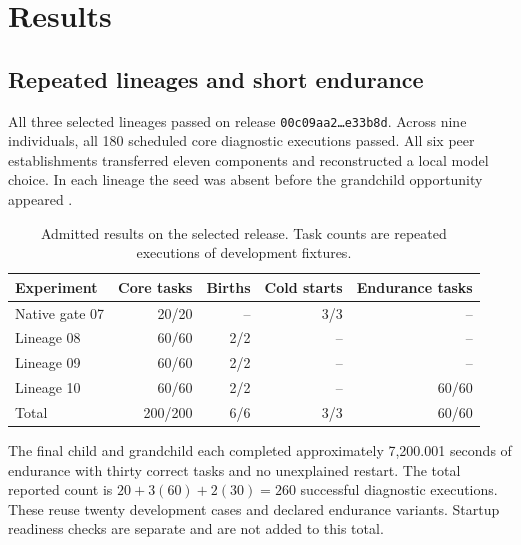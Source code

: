 \documentclass[11pt,letterpaper]{article}
\begin{document}
\section{Results}
\label{sec:results}

\subsection{Repeated lineages and short endurance}

All three selected lineages passed on release
\texttt{00c09aa2\ldots e33b8d}. Across nine individuals, all 180 scheduled core
diagnostic executions passed. All six peer establishments transferred eleven
components and reconstructed a local model choice. In each lineage the seed
was absent before the grandchild opportunity appeared
\cite{gates,lineages,measurements}.

\begin{table}[htbp]
\centering
\caption{Admitted results on the selected release. Task counts are repeated
executions of development fixtures.}
\label{tab:results}
\begin{tabular}{@{}lrrrr@{}}
\toprule
Experiment & Core tasks & Births & Cold starts & Endurance tasks\\
\midrule
Native gate 07 & 20/20 & -- & 3/3 & --\\
Lineage 08 & 60/60 & 2/2 & -- & --\\
Lineage 09 & 60/60 & 2/2 & -- & --\\
Lineage 10 & 60/60 & 2/2 & -- & 60/60\\
\midrule
Total & 200/200 & 6/6 & 3/3 & 60/60\\
\bottomrule
\end{tabular}
\end{table}

The final child and grandchild each completed approximately 7,200.001 seconds
of endurance with thirty correct tasks and no unexplained restart.
The total reported count is $20+3(60)+2(30)=260$ successful diagnostic
executions. These reuse twenty development cases and declared endurance
variants. Startup readiness checks are separate and are not added to this total.
\end{document}
